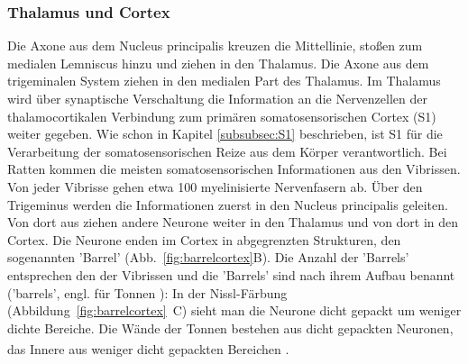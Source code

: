 \documentclass[12pt,a4paper,pdftex]{article}
\begin{document}
\subsubsection*{Thalamus und Cortex}
Die Axone aus dem Nucleus principalis kreuzen die Mittellinie, stoßen zum medialen Lemniscus hinzu und ziehen in den Thalamus. Die Axone aus dem trigeminalen System ziehen in den medialen Part des Thalamus. Im Thalamus wird über synaptische Verschaltung die Information an die Nervenzellen der thalamocortikalen Verbindung zum primären somatosensorischen Cortex (S1) weiter gegeben. 
Wie schon in Kapitel \ref{subsubsec:S1} beschrieben, ist S1 für die Verarbeitung der somatosensorischen Reize aus dem Körper verantwortlich. Bei Ratten kommen die meisten somatosensorischen Informationen aus den Vibrissen. Von jeder Vibrisse gehen etwa 100 myelinisierte Nervenfasern ab. Über den Trigeminus werden die Informationen zuerst in den Nucleus principalis geleiten. Von dort aus ziehen andere Neurone weiter in den Thalamus und von dort in den Cortex. Die Neurone enden im Cortex   in abgegrenzten Strukturen, den sogenannten 'Barrel' (Abb.~\ref{fig:barrelcortex}B). Die Anzahl der 'Barrels' entsprechen den der Vibrissen und die 'Barrels' sind nach ihrem Aufbau benannt ('barrels', engl. für Tonnen ): In der Nissl-Färbung (Abbildung~\ref{fig:barrelcortex}~C) sieht man die Neurone dicht gepackt um weniger dichte Bereiche. Die Wände der Tonnen bestehen aus dicht gepackten Neuronen, das Innere aus weniger dicht gepackten Bereichen \textsuperscript{\cite[8]{smith2008biology}}. 
\end{document}
